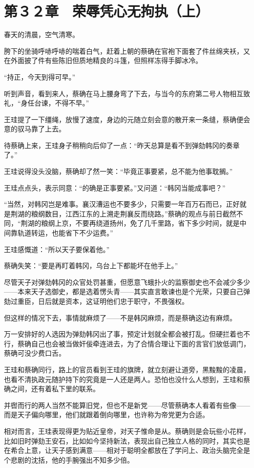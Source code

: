 \section{第３２章　荣辱凭心无拘执（上）}

春天的清晨，空气清寒。

胯下的坐骑呼哧呼哧的喘着白气，赶着上朝的蔡确在官袍下面套了件丝绵夹袄，又在外面披了件有些陈旧但质地精良的斗篷，但照样冻得手脚冰冷。

“持正，今天到得可早。”

听到声音，看到来人，蔡确在马上腰身弯了下去，与当今的东府第二号人物相互致礼，“身任台谏，不得不早。”

王珪提了一下缰绳，放慢了速度，身边的元随立刻会意的散开来一条缝，蔡确便会意的驭马靠了上去。

待蔡确上来，王珪身子稍稍向后仰了一点：“昨天总算是看不到弹劾韩冈的奏章了。”

王珪说得没头没脑，蔡确却了然一笑：“毕竟正事要紧，总不能为他事耽搁。”

王珪点点头，表示同意：“的确是正事要紧。”又问道：“韩冈当能成事吧？”

“当然，对韩冈岂是难事。襄汉漕运也不要多少，只需要一年百万石而已，正好就是荆湖的粮纲数目，江西江东的上溯走荆襄反而绕路。”蔡确的观点与前日截然不同，“荆湖的粮纲上京，不要再绕道扬州，免了几千里路，省下多少时间，就是中间靠轨道转运，也能省下不少运费。”

王珪感慨道：“所以天子要保着他。”

蔡确失笑：“要是再盯着韩冈，乌台上下都能坏在他手上。”

尽管天子对弹劾韩冈的众官处罚甚重，但愿意飞蛾扑火的监察御史也不会减少多少——本来天子选御史，都是选着愣头青——其实直言敢谏也是个光荣，只要自己弹劾过重臣，日后就是资本，这证明他们忠于职守，不畏强权。

但这样的情况下去，事情就麻烦了——不是韩冈麻烦，而是蔡确这边有麻烦。

万一安排好的人选因为弹劾韩冈出了事，预定计划就全都会被打乱。但硬拦着也不行，蔡确自己也会被当做奸佞牵连进去，为了合情合理让下面的言官们放低调门，蔡确可没少费口舌。

王珪和蔡确同行，路上的官员看到王珪的旗牌，就立刻避让道旁，黑黢黢的凌晨，也看不清执政元随护持下的究竟是一人还是两人。恐怕也没什么人想到，王珪和蔡确之间，还有着私下里的联系。

并辔而行的两人当然不能算旧党，但也不是新党——尽管蔡确本人看着有些像——而是天子偏向哪里，他们就跟着倒向哪里，也许称为帝党更为合适。

相对而言，王珪表现得更为贴近皇帝，对天子惟命是从。蔡确则是会玩些小花样，比如旧时弹劾王安石，比如如今坚持新法，表现出自己独立人格的同时，其实也是在希合上意，让天子感到满意——相对于聪明全都放在了学问上、政治头脑完全是个悲剧的沈括，他的手腕强出不知多少倍。

